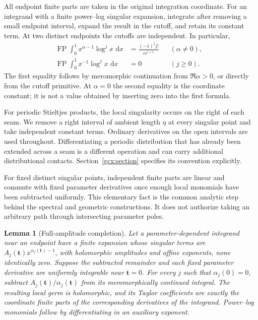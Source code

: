 \documentclass[11pt]{article}
\numberwithin{equation}{section}
\theoremstyle{plain}
\newtheorem{lemma}[theorem]{Lemma}
\theoremstyle{definition}
\theoremstyle{remark}
\DeclareMathOperator{\FP}{FP}
\newcommand{\dd}{\,\mathrm d}
\begin{document}
All endpoint finite parts are taken in the original integration
coordinate. For an integrand with a finite power--log singular expansion,
integrate after removing a small endpoint interval, expand the result
in the cutoff, and retain its constant term. At two distinct endpoints
the cutoffs are independent. In particular,
\begin{align}
 \FP\int_0^1 x^{\alpha-1}\log^j x\,\dd x
   &=\frac{(-1)^j j!}{\alpha^{j+1}}
                    &&(\alpha\ne0),\label{scope:monomial}\\
 \FP\int_0^1 x^{-1}\log^j x\,\dd x&=0
                    &&(j\ge0).\label{scope:resonantmonomial}
\end{align}
The first equality follows by meromorphic continuation from
$\Re\alpha>0$, or directly from the cutoff primitive.
At $\alpha=0$ the second equality is the coordinate constant;
it is not a value obtained by inserting zero into the first formula.

For periodic Stieltjes products, the local singularity occurs on the
right of each seam. We remove a right interval of ambient length
$\eta$ at every singular point and take independent constant terms.
Ordinary derivatives on the open intervals are used throughout.
Differentiating a periodic distribution that has already been extended
across a seam is a different operation and can carry additional
distributional contacts. Section~\ref{gcx:section} specifies its
convention explicitly.

For fixed distinct singular points, independent finite parts are linear
and commute with fixed parameter derivatives once enough local
monomials have been subtracted uniformly. This elementary fact is the
common analytic step behind the spectral and geometric constructions.
It does not authorize taking an arbitrary path through intersecting
parameter poles.

\begin{lemma}[Full-amplitude completion]\label{scope:completionlemma}
Let a parameter-dependent integrand near an endpoint have a finite
expansion whose singular terms are
$A_j(\mathbf t)x^{\alpha_j(\mathbf t)-1}$, with holomorphic amplitudes
and affine exponents, none identically zero. Suppose the subtracted remainder and each fixed
parameter derivative are uniformly integrable near $\mathbf t=0$.
For every $j$ such that $\alpha_j(0)=0$, subtract
$A_j(\mathbf t)/\alpha_j(\mathbf t)$ from its meromorphically continued
integral. The resulting local germ is holomorphic, and its Taylor
coefficients are exactly the coordinate finite parts of the
corresponding derivatives of the integrand. Power--log monomials follow
by differentiating in an auxiliary exponent.
\end{lemma}
\end{document}
